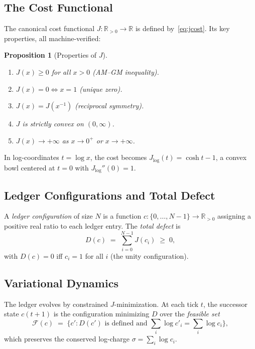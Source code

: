 \documentclass[11pt,a4paper]{article}
\theoremstyle{plain}
\newtheorem{proposition}[theorem]{Proposition}
\theoremstyle{definition}
\theoremstyle{remark}
\newcommand{\R}{\mathbb{R}}
\newcommand{\Jcost}{J}
\begin{document}
\subsection{The Cost Functional}

The canonical cost functional $\Jcost : \R_{>0} \to \R$ is defined by~\eqref{eq:jcost}.
Its key properties, all machine-verified:

\begin{proposition}[Properties of $\Jcost$]\label{prop:jcost}
\begin{enumerate}[nosep,label=(\roman*)]
\item $\Jcost(x) \ge 0$ for all $x > 0$ \quad (AM--GM inequality).
\item $\Jcost(x) = 0 \iff x = 1$ \quad (unique zero).
\item $\Jcost(x) = \Jcost(x^{-1})$ \quad (reciprocal symmetry).
\item $\Jcost$ is strictly convex on $(0,\infty)$.
\item $\Jcost(x) \to +\infty$ as $x \to 0^+$ or $x \to +\infty$.
\end{enumerate}
\end{proposition}

In log-coordinates $t = \log x$, the cost becomes $\Jcost_{\log}(t) = \cosh t - 1$, a convex bowl centered at $t=0$ with $\Jcost_{\log}''(0) = 1$.

\subsection{Ledger Configurations and Total Defect}

A \emph{ledger configuration} of size $N$ is a function $c : \{0,\ldots,N-1\} \to \R_{>0}$ assigning a positive real ratio to each ledger entry.
The \emph{total defect} is
\begin{equation}\label{eq:totaldefect}
D(c) \;=\; \sum_{i=0}^{N-1} \Jcost(c_i) \;\ge\; 0,
\end{equation}
with $D(c) = 0$ iff $c_i = 1$ for all $i$ (the unity configuration).

\subsection{Variational Dynamics}

The ledger evolves by constrained $\Jcost$-minimization.
At each tick $t$, the successor state $c(t{+}1)$ is the configuration minimizing $D$ over the \emph{feasible set}
\[
\mathcal{F}(c) \;=\; \bigl\{c' : D(c') \text{ is defined and } \textstyle\sum_i \log c'_i = \sum_i \log c_i\bigr\},
\]
which preserves the conserved log-charge $\sigma = \sum_i \log c_i$.
\end{document}
